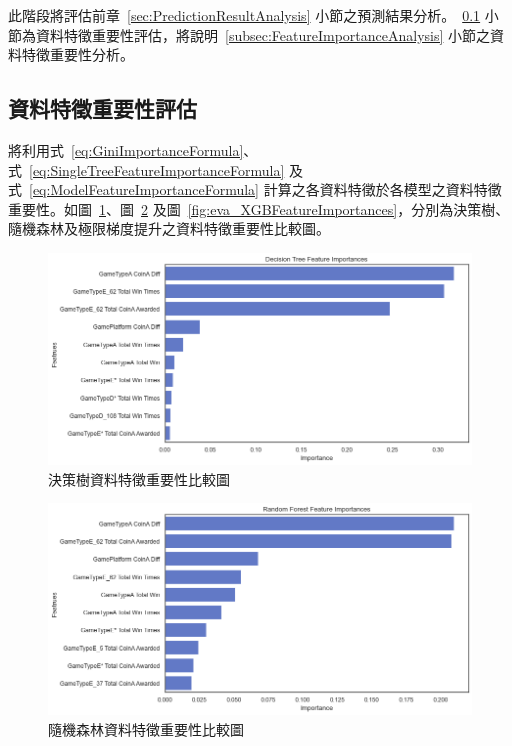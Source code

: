 此階段將評估前章~\ref{sec:PredictionResultAnalysis} 小節之預測結果分析。~\ref{subsec:FeatureImportanceEvaluation} 小節為資料特徵重要性評估，將說明~\ref{subsec:FeatureImportanceAnalysis} 小節之資料特徵重要性分析。

\subsection{資料特徵重要性評估}
\label{subsec:FeatureImportanceEvaluation}

將利用式~\ref{eq:GiniImportanceFormula}、式~\ref{eq:SingleTreeFeatureImportanceFormula} 及式~\ref{eq:ModelFeatureImportanceFormula} 計算之各資料特徵於各模型之資料特徵重要性。如圖~\ref{fig:eva_DTFeatureImportances}、圖~\ref{fig:eva_RFFeatureImportances} 及圖~\ref{fig:eva_XGBFeatureImportances}，分別為決策樹、隨機森林及極限梯度提升之資料特徵重要性比較圖。

\begin{figure}[!htb]
    \begin{center}
      \includegraphics[width=1\textwidth]{figures/evaluation/Image_DTFeatureImportances.png}
      \caption[決策樹資料特徵重要性比較圖]{決策樹資料特徵重要性比較圖}
      \label{fig:eva_DTFeatureImportances}
    \end{center}
\end{figure}
\newpage

\begin{figure}[!htb]
    \begin{center}
      \includegraphics[width=1\textwidth]{figures/evaluation/Image_RFFeatureImportances.png}
      \caption[隨機森林資料特徵重要性比較圖]{隨機森林資料特徵重要性比較圖}
      \label{fig:eva_RFFeatureImportances}
    \end{center}
\end{figure}

